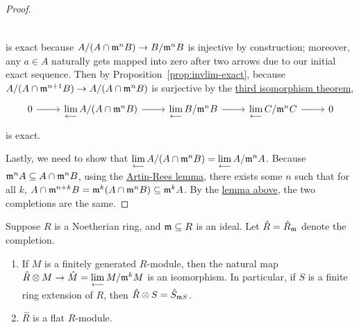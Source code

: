 \begin{proof}
\begin{equation*}
\begin{tikzcd}
        \end{tikzcd}
    \end{equation*}
    is exact because \(A/(A \cap \mathfrak{m}^n B) \to B/\mathfrak{m}^n B\) is injective by construction;
    moreover, any \(a \in A\) naturally gets mapped into zero after two arrows due to our initial exact sequence.
    Then by Proposition~\ref{prop:invlim-exact},
    because \(A/(A \cap \mathfrak{m}^{n+1} B) \to A/(A \cap \mathfrak{m}^n B)\) is surjective
    by the \hyperref[thm:iso-3-ring]{third isomorphism theorem},
    \begin{equation*}
        \begin{tikzcd}
            0 \arrow{r} & \invlim A/(A \cap \mfk{m}^n B) \arrow{r} & \invlim B/\mfk{m}^n B \arrow{r} & \invlim C/\mfk{m}^n C \arrow{r} & 0
        \end{tikzcd}
    \end{equation*}
    is exact.

    Lastly, we need to show that \(\operatorname{\displaystyle\lim_{\longleftarrow}} A/(A \cap \mathfrak{m}^n B) = \operatorname{\displaystyle\lim_{\longleftarrow}} A/\mathfrak{m}^n A\).
    Because \(\mathfrak{m}^n A \subseteq A \cap \mathfrak{m}^n B\),
    using the \hyperref[prop:artin-rees]{Artin-Rees lemma},
    there exists some \(n\) such that for all \(k\), \(A \cap \mathfrak{m}^{n+k} B = \mathfrak{m}^k(A \cap \mathfrak{m}^n B) \subseteq \mathfrak{m}^k A\).
    By the \hyperref[lem:isomorphism-completions]{lemma above},
    the two completions are the same.
\end{proof}
\begin{theorem}\label{thm:noetherian-module-completions}
    Suppose \(R\) is a Noetherian ring, and \(\mathfrak{m} \subseteq R\) is an ideal.
    Let \(\hat{R} = \hat{R}_{\mathfrak{m}}\) denote the completion.
    \begin{enumerate}[label={(\alph*)}, itemsep=0mm]
        \item If \(M\) is a finitely generated \(R\)-module,
            then the natural map \(\hat{R} \otimes M \to \hat{M} = \operatorname{\displaystyle\lim_{\longleftarrow}} M/\mathfrak{m}^k M\) is an isomorphism.
            In particular, if \(S\) is a finite ring extension of \(R\),
            then \(\hat{R} \otimes S = \hat{S}_{\mathfrak{m}S}\).
        \item \(\hat{R}\) is a flat \(R\)-module.
    \end{enumerate}
\end{theorem}
